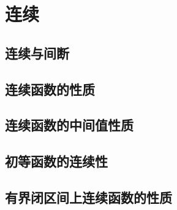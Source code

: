 

\chapter{连\emspace 续}\label{ch:3}
\section{连续与间断}
\begin{exercise}
\end{exercise}
\section{连续函数的性质}
\begin{exercise}
\end{exercise}
\section{连续函数的中间值性质}
\begin{exercise}
\end{exercise}
\section{初等函数的连续性}
\begin{exercise}
\end{exercise}
\section{有界闭区间上连续函数的性质}
\begin{exercise}
\end{exercise}
\begin{exercise*}
\end{exercise*}


\endinput
